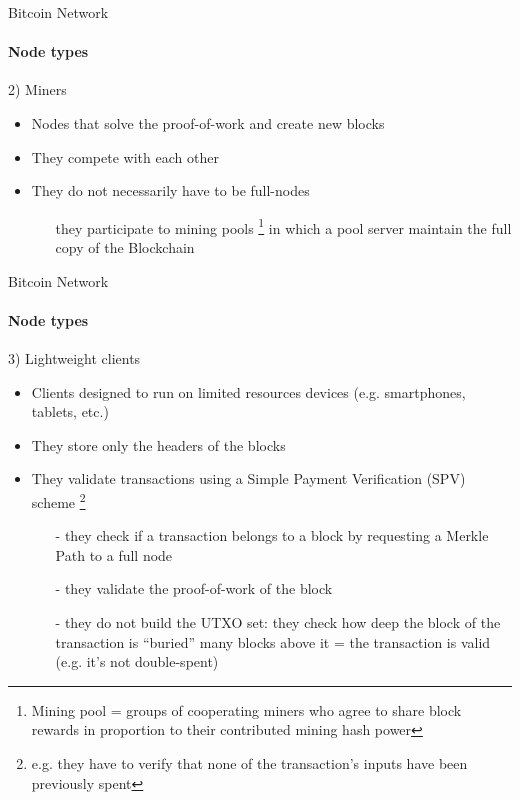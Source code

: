 \documentclass{beamer}
\begin{document}
  
  
  
   \begin{frame}{Bitcoin Network}
    \framesubtitle{Node types}
    \begin{block}{2) Miners}
        \begin{itemize}
            \item Nodes that solve the proof-of-work and create new blocks
            \item They compete with each other
            \item They do not necessarily have to be full-nodes
            \begin{itemize}
                \item[\MVRightarrow] they participate to mining pools \footnote{Mining pool = groups of cooperating miners who agree to share block rewards in proportion to their contributed mining hash power} in which a pool server maintain the full copy of the Blockchain
            \end{itemize}
        \end{itemize}
    \end{block}
  \end{frame}
  
  
  
  
  \begin{frame}{Bitcoin Network}
    \framesubtitle{Node types}
    \begin{block}{3) Lightweight clients}
        \begin{itemize}
            \item Clients designed to run on limited resources devices (e.g. smartphones, tablets, etc.) 
            \item They store only the headers of the blocks 
            \item They validate transactions using a Simple Payment Verification (SPV) scheme \footnote{e.g. they have to verify that none of the transaction's inputs have been previously spent}
            \begin{itemize}
                \item[-] they check if a transaction belongs to a block by requesting a Merkle Path to a full node
                \item[-] they validate the proof-of-work of the block
                \item[-] they do not build the UTXO set: they check how deep the block of the transaction is ``buried'' \MVRightarrow many blocks above it = the transaction is valid (e.g. it's not double-spent)
            \end{itemize}
        \end{itemize}
    \end{block}
  \end{frame}
  
\end{document}
